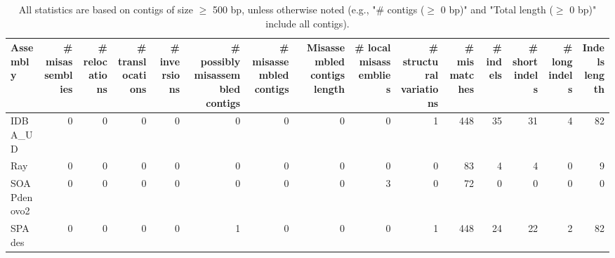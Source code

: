 \documentclass[12pt,a4paper]{article}
\begin{document}
\begin{table}[ht]
\begin{center}
\caption{All statistics are based on contigs of size $\geq$ 500 bp, unless otherwise noted (e.g., "\# contigs ($\geq$ 0 bp)" and "Total length ($\geq$ 0 bp)" include all contigs).}
\begin{tabular}{|l*{14}{|r}|}
\hline
Assembly & \# misassemblies &     \# relocations &     \# translocations &     \# inversions & \# possibly misassembled contigs & \# misassembled contigs & Misassembled contigs length & \# local misassemblies & \# structural variations & \# mismatches & \# indels &     \# short indels &     \# long indels & Indels length \\ \hline
IDBA\_UD & 0 & 0 & 0 & 0 & 0 & 0 & 0 & 0 & 1 & 448 & 35 & 31 & 4 & 82 \\ \hline
Ray & 0 & 0 & 0 & 0 & 0 & 0 & 0 & 0 & 0 & 83 & 4 & 4 & 0 & 9 \\ \hline
SOAPdenovo2 & 0 & 0 & 0 & 0 & 0 & 0 & 0 & 3 & 0 & 72 & 0 & 0 & 0 & 0 \\ \hline
SPAdes & 0 & 0 & 0 & 0 & 1 & 0 & 0 & 0 & 1 & 448 & 24 & 22 & 2 & 82 \\ \hline
\end{tabular}
\end{center}
\end{table}
\end{document}

